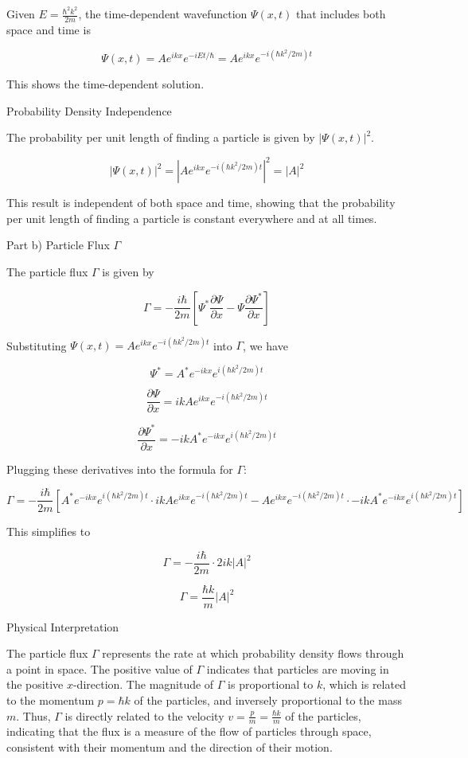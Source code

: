 \documentclass[a4paper,11pt]{article}
\begin{document}
Given \( E = \frac{\hbar^2k^2}{2m} \), the time-dependent wavefunction \( \Psi(x,t) \) that includes both space and time is

\[
\Psi(x,t) = Ae^{ikx}e^{-iEt/\hbar} = Ae^{ikx}e^{-i(\hbar k^2/2m)t}
\]

This shows the time-dependent solution.

Probability Density Independence

The probability per unit length of finding a particle is given by \( |\Psi(x,t)|^2 \).

\[
|\Psi(x,t)|^2 = |Ae^{ikx}e^{-i(\hbar k^2/2m)t}|^2 = |A|^2
\]

This result is independent of both space and time, showing that the probability per unit length of finding a particle is constant everywhere and at all times.

Part b) Particle Flux \( \Gamma \)

The particle flux \( \Gamma \) is given by

\[
\Gamma = -\frac{i\hbar}{2m}\left[ \Psi^{*}\frac{\partial\Psi}{\partial x} - \Psi\frac{\partial\Psi^{*}}{\partial x} \right]
\]

Substituting \( \Psi(x,t) = Ae^{ikx}e^{-i(\hbar k^2/2m)t} \) into \( \Gamma \), we have

\[
\Psi^{*} = A^*e^{-ikx}e^{i(\hbar k^2/2m)t}
\]

\[
\frac{\partial\Psi}{\partial x} = ikAe^{ikx}e^{-i(\hbar k^2/2m)t}
\]

\[
\frac{\partial\Psi^{*}}{\partial x} = -ikA^*e^{-ikx}e^{i(\hbar k^2/2m)t}
\]

Plugging these derivatives into the formula for \( \Gamma \):

\[
\Gamma = -\frac{i\hbar}{2m}\left[ A^*e^{-ikx}e^{i(\hbar k^2/2m)t} \cdot ikAe^{ikx}e^{-i(\hbar k^2/2m)t} - Ae^{ikx}e^{-i(\hbar k^2/2m)t} \cdot -ikA^*e^{-ikx}e^{i(\hbar k^2/2m)t} \right]
\]

This simplifies to

\[
\Gamma = -\frac{i\hbar}{2m} \cdot 2ik|A|^2
\]

\[
\Gamma = \frac{\hbar k}{m}|A|^2
\]

Physical Interpretation

The particle flux \( \Gamma \) represents the rate at which probability density flows through a point in space. The positive value of \( \Gamma \) indicates that particles are moving in the positive \( x \)-direction. The magnitude of \( \Gamma \) is proportional to \( k \), which is related to the momentum \( p = \hbar k \) of the particles, and inversely proportional to the mass \( m \). Thus, \( \Gamma \) is directly related to the velocity \( v = \frac{p}{m} = \frac{\hbar k}{m} \) of the particles, indicating that the flux is a measure of the flow of particles through space, consistent with their momentum and the direction of their motion. \\ 
\end{document}
